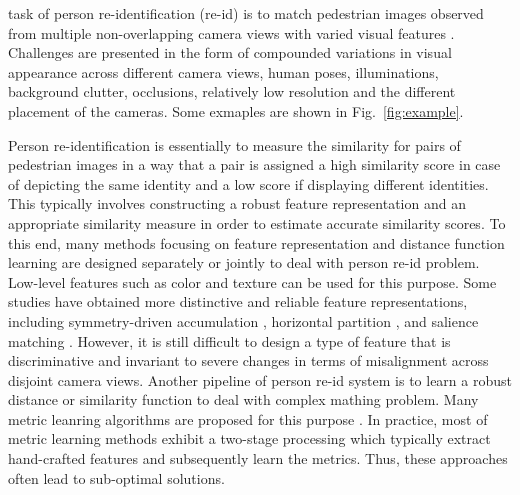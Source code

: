 \documentclass[10pt,journal,twocolumn]{IEEEtran}
\begin{document}
  task of person re-identification (re-id) is to match pedestrian images observed from multiple non-overlapping
camera views with varied visual features \cite{Gheissari2006Person,Roth2014Mahalanobis,MidLevelFilter,Zheng2011Person,Xiong2014Person,Zhao2013Unsupervised,Pedagadi2013Local,LADF,Zhao2013SalMatch}.
 Challenges are presented in the form of compounded variations in visual appearance across different camera views, human poses, illuminations, background clutter, occlusions, relatively low resolution and the different placement of the cameras. Some exmaples are shown in Fig.~\ref{fig:example}.


Person re-identification is essentially to measure the similarity for pairs of pedestrian images in a way that a pair is assigned a high similarity score in case of depicting the same identity and a low score if displaying different identities. This typically involves constructing a robust feature representation and an appropriate similarity measure in order to estimate accurate similarity scores. To this end, many methods focusing on feature representation and distance function learning are designed separately or jointly to deal with person re-id problem. Low-level features such as color and texture can be used for this purpose. Some studies have obtained more distinctive and reliable feature representations,
including symmetry-driven accumulation \cite{Farenzena2010Person}, horizontal partition \cite{LOMOMetric,Zheng2013PAMI}, and salience matching \cite{Zhao2013Unsupervised,Zhao2013SalMatch}. However, it is still difficult to design a type of feature that is discriminative and invariant to severe changes in terms of misalignment across disjoint camera views. Another pipeline of person re-id system is to learn a robust distance or similarity function to deal with complex mathing problem. Many metric leanring algorithms are proposed for this purpose \cite{Pedagadi2013Local,Kedem2012Nonlinear,Kostinger2012Large,Xiong2014Person,LADF,PCCA,Zheng2013PAMI,Hirzer2012Person}.
In practice, most of metric learning methods exhibit a two-stage processing which typically extract hand-crafted features and subsequently learn the metrics. Thus, these approaches often lead to sub-optimal solutions.
\end{document}
